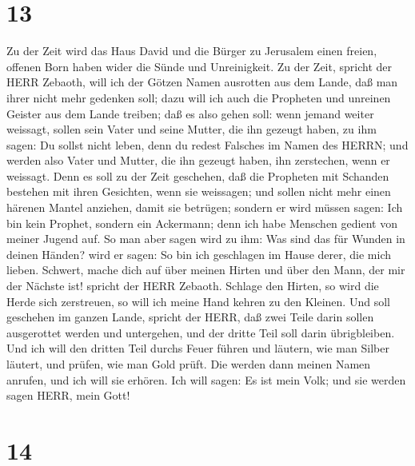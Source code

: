 \hypertarget{section-12}{%
\section{13}\label{section-12}}

 Zu der Zeit wird das Haus David und die Bürger zu Jerusalem
einen freien, offenen Born haben wider die Sünde und Unreinigkeit.
 Zu der Zeit, spricht der HERR Zebaoth, will ich der Götzen
Namen ausrotten aus dem Lande, daß man ihrer nicht mehr gedenken soll;
dazu will ich auch die Propheten und unreinen Geister aus dem Lande
treiben;  daß es also gehen soll: wenn jemand weiter
weissagt, sollen sein Vater und seine Mutter, die ihn gezeugt haben, zu
ihm sagen: Du sollst nicht leben, denn du redest Falsches im Namen des
HERRN; und werden also Vater und Mutter, die ihn gezeugt haben, ihn
zerstechen, wenn er weissagt.  Denn es soll zu der Zeit
geschehen, daß die Propheten mit Schanden bestehen mit ihren Gesichten,
wenn sie weissagen; und sollen nicht mehr einen härenen Mantel anziehen,
damit sie betrügen;  sondern er wird müssen sagen: Ich bin
kein Prophet, sondern ein Ackermann; denn ich habe Menschen gedient von
meiner Jugend auf.  So man aber sagen wird zu ihm: Was sind
das für Wunden in deinen Händen? wird er sagen: So bin ich geschlagen im
Hause derer, die mich lieben.  Schwert, mache dich auf über
meinen Hirten und über den Mann, der mir der Nächste ist! spricht der
HERR Zebaoth. Schlage den Hirten, so wird die Herde sich zerstreuen, so
will ich meine Hand kehren zu den Kleinen.  Und soll
geschehen im ganzen Lande, spricht der HERR, daß zwei Teile darin sollen
ausgerottet werden und untergehen, und der dritte Teil soll darin
übrigbleiben.  Und ich will den dritten Teil durchs Feuer
führen und läutern, wie man Silber läutert, und prüfen, wie man Gold
prüft. Die werden dann meinen Namen anrufen, und ich will sie erhören.
Ich will sagen: Es ist mein Volk; und sie werden sagen HERR, mein Gott!

\hypertarget{section-13}{%
\section{14}\label{section-13}}

